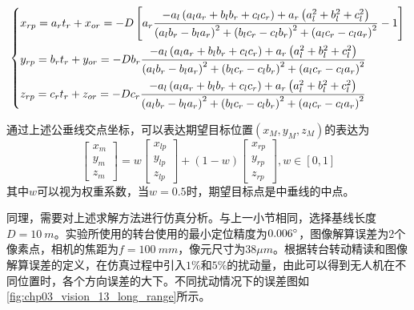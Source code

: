 \begin{equation}
\left\{ \begin{gathered}
{x_{rp}} = {a_r}{t_r} + {x_{or}} =  - D\left[ {{a_r}\frac{{ - {a_l}\left( {{a_l}{a_r} + {b_l}{b_r} + {c_l}{c_r}} \right) + {a_r}\left( {a_l^2 + b_l^2 + c_l^2} \right)}}{{{{\left( {{a_l}{b_r} - {b_l}{a_r}} \right)}^2} + {{\left( {{b_l}{c_r} - {c_l}{b_r}} \right)}^2} + {{\left( {{a_l}{c_r} - {c_l}{a_r}} \right)}^2}}} - 1} \right] \hfill \\
{y_{rp}} = {b_r}{t_r} + {y_{or}} =  - D{b_r}\frac{{ - {a_l}\left( {{a_l}{a_r} + {b_l}{b_r} + {c_l}{c_r}} \right) + {a_r}\left( {a_l^2 + b_l^2 + c_l^2} \right)}}{{{{\left( {{a_l}{b_r} - {b_l}{a_r}} \right)}^2} + {{\left( {{b_l}{c_r} - {c_l}{b_r}} \right)}^2} + {{\left( {{a_l}{c_r} - {c_l}{a_r}} \right)}^2}}} \hfill \\
{z_{rp}} = {c_r}{t_r} + {z_{or}} =  - D{c_r}\frac{{ - {a_l}\left( {{a_l}{a_r} + {b_l}{b_r} + {c_l}{c_r}} \right) + {a_r}\left( {a_l^2 + b_l^2 + c_l^2} \right)}}{{{{\left( {{a_l}{b_r} - {b_l}{a_r}} \right)}^2} + {{\left( {{b_l}{c_r} - {c_l}{b_r}} \right)}^2} + {{\left( {{a_l}{c_r} - {c_l}{a_r}} \right)}^2}}} \hfill \\ 
\end{gathered}  \right.
\end{equation}

通过上述公垂线交点坐标，可以表达期望目标位置$(x_M, y_M, z_M)$的表达为
\begin{equation}
\left[ {\begin{array}{*{20}{c}}
	{{x_m}} \\ 
	{{y_m}} \\ 
	{{z_m}} 
	\end{array}} \right] = w\left[ {\begin{array}{*{20}{c}}
	{{x_{lp}}} \\ 
	{{y_{lp}}} \\ 
	{{z_{lp}}} 
	\end{array}} \right] + \left( {1 - w} \right)\left[ {\begin{array}{*{20}{c}}
	{{x_{rp}}} \\ 
	{{y_{rp}}} \\ 
	{{z_{rp}}} 
	\end{array}} \right],w \in [0,1]
\end{equation}
其中$w$可以视为权重系数，当$w=0.5$时，期望目标点是中垂线的中点。

同理，需要对上述求解方法进行仿真分析。与上一小节相同，选择基线长度$D=10\ m$。实验所使用的转台使用的最小定位精度为$0.006\degree$，图像解算误差为2个像素点，相机的焦距为$f=100\ mm$，像元尺寸为$38\mu m$。根据转台转动精读和图像解算误差的定义，在仿真过程中引入$1\%$和$5\%$的扰动量，由此可以得到无人机在不同位置时，各个方向误差的大下。不同扰动情况下的误差图如\ref{fig:chp03_vision_13_long_range}所示。

